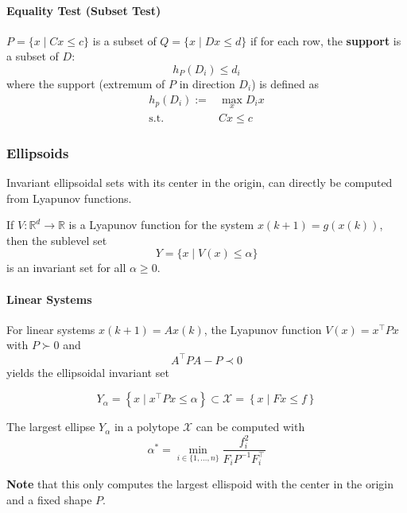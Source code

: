 \paragraph{Equality Test (Subset Test)}
$P=\{x\mid Cx\leq c\}$ is a subset of $Q=\{x\mid Dx\leq d\}$ if for each row, the \textbf{support} is a subset of $D$:
\begin{equation*}
    h_P(D_i) \leq d_i
\end{equation*}
where the support (extremum of $P$ in direction $D_i$) is defined as
\begin{align*}
    h_p(D_i) :=     & \max_x D_i x \\
    \mathrm{s.t.}\; & Cx\leq c
\end{align*}

\subsubsection{Ellipsoids}
Invariant ellipsoidal sets with its center in the origin, can directly be computed from Lyapunov functions.

\newpar{}
If $V:\mathbb{R}^d\to\mathbb{R}$ is a Lyapunov function for the system $x(k+1)=g(x(k))$, then the sublevel set
\begin{equation*}
    Y = \{x\mid V(x)\leq \alpha\}
\end{equation*}
is an invariant set for all $\alpha \geq 0$.

\paragraph{Linear Systems}
For linear systems $x(k+1)=Ax(k)$, the Lyapunov function $V(x)=x^\top Px$ with $P\succ 0$  and
\begin{equation*}
    A^\top PA-P \prec 0
\end{equation*}
yields the ellipsoidal invariant set

\begin{equation*}
    Y_\alpha = \left\{x\mid x^\top Px\leq \alpha\right\} \subset \mathcal{X}= \left\{x\mid Fx\leq f\right\}
\end{equation*}

\newpar{}

The largest ellipse $Y_\alpha$ in a polytope $\mathcal{X}$ can be computed with
\begin{equation*}
    \alpha^* = \min_{i\in \{1,\ldots, n\}} \frac{f_i^2}{F_i P^{-1} F_i^\top}
\end{equation*}

\textbf{Note} that this only computes the largest ellispoid with the center in the origin and a fixed shape $P$.